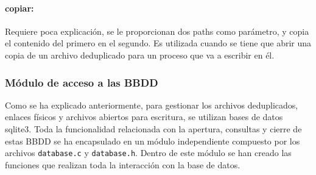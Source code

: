 \documentclass[12pt,a4paper]{article}
\begin{document}
\paragraph{copiar:} Requiere poca explicación, se le proporcionan dos paths como parámetro, y copia el contenido del primero en el segundo. Es utilizada cuando se tiene que abrir una copia de un archivo deduplicado para un proceso que va a escribir en él.

\subsubsection{Módulo de acceso a las BBDD}

Como se ha explicado anteriormente, para gestionar los archivos deduplicados, enlaces físicos y archivos abiertos para escritura, se utilizan bases de datos sqlite3. Toda la funcionalidad relacionada con la apertura, consultas y cierre de estas BBDD se ha encapsulado en un módulo independiente compuesto por los archivos \texttt{\small database.c} y \texttt{\small database.h}. Dentro de este módulo se han creado las funciones que realizan toda la interacción con la base de datos.
\end{document}
